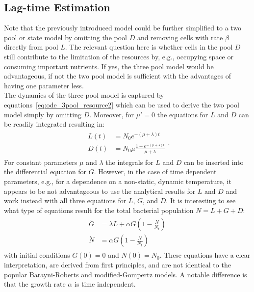 \documentclass[10pt,twocolumn,5p]{elsarticle}
\numberwithin{equation}{section}
\begin{document}
\subsection{Lag-time Estimation}
Note that the previously introduced model could be further simplified to a two pool or state model by omitting the pool $D$ and removing cells with rate $\beta$ directly from pool $L$.
The relevant question here is whether cells in the pool $D$ still contribute to the limitation of the resources by, e.g., occupying space or consuming important nutrients.
If yes, the three pool model would be advantageous, if not the two pool model is sufficient with the advantages of having one parameter less.\\
%
The dynamics of the three pool model is captured by equations~\ref{eq:ode_3pool_resource2} which can be used to derive the two pool model simply by omitting $D$.
Moreover, for $\mu'=0$ the equations for $L$ and $D$ can be readily integrated resulting in:
\begin{align}
    \begin{split}
        L(t) &= N_0 e^{-(\mu+\lambda)t}\\
        D(t) &= N_0 \mu \frac{1-e^{-(\mu+\lambda)t}}{\mu+\lambda
       }
    \end{split}.
\end{align}
For constant parameters $\mu$ and $\lambda$ the integrals for $L$ and $D$ can be inserted into the differential equation for $G$.
However, in the case of time dependent parameters, e.g., for a dependence on a non-static, dynamic temperature, it appears to be not advantageous to use the analytical results for $L$ and $D$ and work instead with all three equations for $L$, $G$, and $D$.
It is interesting to see what type of equations result for the total bacterial population $N=L+G+D$:
\begin{align}
    \begin{split}
        \dot{G} &= \lambda L + \alpha G\left(1-\frac{N}{N_t}\right)\\
        \dot{N} &= \alpha G\left(1-\frac{N}{N_t}\right)
    \end{split}
\end{align}
with initial conditions $G(0)=0$ and $N(0)=N_0$.
These equations have a clear interpretation, are derived from first principles, and are not identical to the popular Barayni-Roberts and modified-Gompertz models.
A notable difference is that the growth rate $\alpha$ is time independent.
\end{document}
